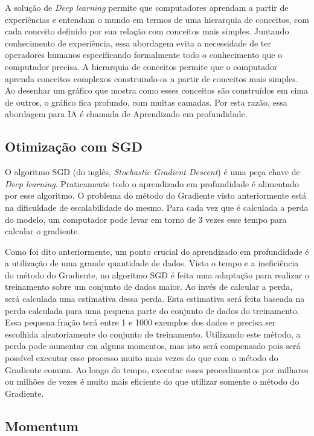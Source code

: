 A solução de \textit{Deep learning} permite que computadores aprendam
a partir de experiências e entendam o mundo em termos de uma
hierarquia de conceitos, com cada conceito definido por sua
relação com conceitos mais simples. Juntando conhecimento de
experiência, essa abordagem evita a necessidade de ter operadores
humanos especificando formalmente todo o conhecimento que o computador
precisa. A hierarquia de conceitos permite que o computador aprenda
conceitos complexos construindo-os a partir de conceitos mais
simples. Ao desenhar um gráfico que mostra como esses conceitos são
construídos em cima de outros, o gráfico fica profundo, com muitas
camadas. Por esta razão, essa abordagem para IA é chamada de
Aprendizado em profundidade\cite{Goodfellow-et-al-2016-Book}.

\subsection{Otimização com SGD}

O algoritmo SGD (do inglês, \textit{Stochastic Gradient
  Descent})\cite{Goodfellow-et-al-2016-Book} é uma peça chave de
\textit{Deep learning}. Praticamente todo o aprendizado em
profundidade é alimentado por esse algoritmo. O problema do método do
Gradiente visto anteriormente está na dificuldade de escalabilidade do
mesmo. Para cada vez que é calculada a perda do modelo, um computador
pode levar em torno de 3 vezes esse tempo para calcular o gradiente.

Como foi dito anteriormente, um ponto crucial do aprendizado em
profundidade é a utilização de uma grande quantidade de dados. Visto o
tempo e a ineficiência do método do Gradiente, no algoritmo SGD é
feita uma adaptação para realizar o treinamento sobre um conjunto de
dados maior. Ao invés de calcular a perda, será calculada uma
estimativa dessa perda. Esta estimativa será feita baseada na perda
calculada para uma pequena parte do conjunto de dados do
treinamento. Essa pequena fração terá entre 1 e 1000 exemplos dos
dados e precisa ser escolhida aleatoriamente do conjunto de
treinamento. Utilizando este método, a perda pode aumentar em alguns
momentos, mas isto será compensado pois será possível executar esse
processo muito mais vezes do que com o método do Gradiente
comum. Ao longo do tempo, executar esses procedimentos por milhares ou
milhões de vezes é muito mais eficiente do que utilizar somente o
método do Gradiente.

\subsection{Momentum}

